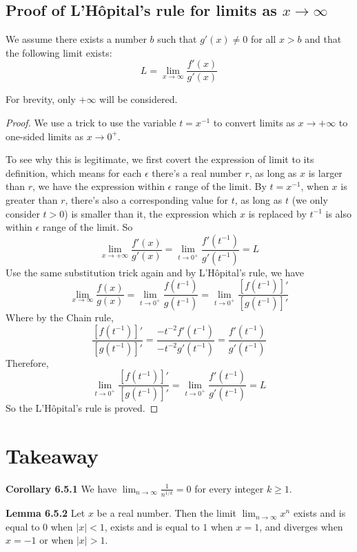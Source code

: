 \documentclass{article}
\begin{document}
\subsection{Proof of L'H\^opital's rule  for limits as $x\to \infty$}
We assume there exists a number \( b \) such that
\( g'(x) \neq 0 \) for all \( x > b \) and that the following limit exists:
\[
    L = \lim_{x \to \infty} \frac{f'(x)}{g'(x)}
\]

For brevity, only $+ \infty $ will be considered.
\begin{proof}
    We use a trick to use the variable \( t = x^{-1} \) to convert limits
    as \( x \to +\infty \) to one-sided limits as \( x \to 0^+ \).

    To see why this is legitimate, we first covert the expression of limit to
    its definition, which means for each $\epsilon$ there's a real number $r$,
    as long as $x$ is larger than $r$, we have the expression within $\epsilon$
    range of the limit. By \( t = x^{-1} \), when $x$ is greater than $r$, there's
    also a corresponding value for $t$, as long as $t$ (we only consider $t>0$)
    is smaller than it, the expression which $x$ is replaced by $t^{-1}$ is
    also within $\epsilon$ range of the limit. So
    \[
        \lim_{x \to +\infty} \frac{f'(x)}{g'(x)} =
        \lim_{t \to 0^+} \frac{f'(t^{-1})}{g'(t^{-1})} = L
    \]
    Use the same substitution trick again and by L'H\^opital's rule, we have
    \[
        \lim_{x \to \infty} \frac{f(x)}{g(x)}
        = \lim_{t \to 0^+} \frac{f(t^{-1})}{g(t^{-1})}
        = \lim_{t \to 0^+} \frac{[f(t^{-1})]'}{[g(t^{-1})]'}
    \]
    Where by the Chain rule,
    \[
        \frac{[f(t^{-1})]'}{[g(t^{-1})]'}
        = \frac{-t^{-2} f'(t^{-1})}{-t^{-2} g'(t^{-1})}
        = \frac{f'(t^{-1})}{g'(t^{-1})}
    \]
    Therefore,
    \[
        \lim_{t \to 0^+} \frac{[f(t^{-1})]'}{[g(t^{-1})]'}
        = \lim_{t \to 0^+} \frac{f'(t^{-1})}{g'(t^{-1})} = L
    \]
    So the L'Hôpital's rule is proved.
\end{proof}


\newpage


\section{Takeaway}
\textbf{Corollary 6.5.1} We have
\(\lim_{n \to \infty} \frac{1}{n^{1/k}} = 0\) for every integer \( k \geq 1\).

\medskip

\textbf{Lemma 6.5.2} Let $x$ be a real number. Then the limit
$\lim_{n \to \infty} x^n$ exists and is equal to $0$ when $|x| < 1$,
exists and is equal to $1$ when $x = 1$, and diverges when $x = -1$
or when $|x| > 1$.
\end{document}
